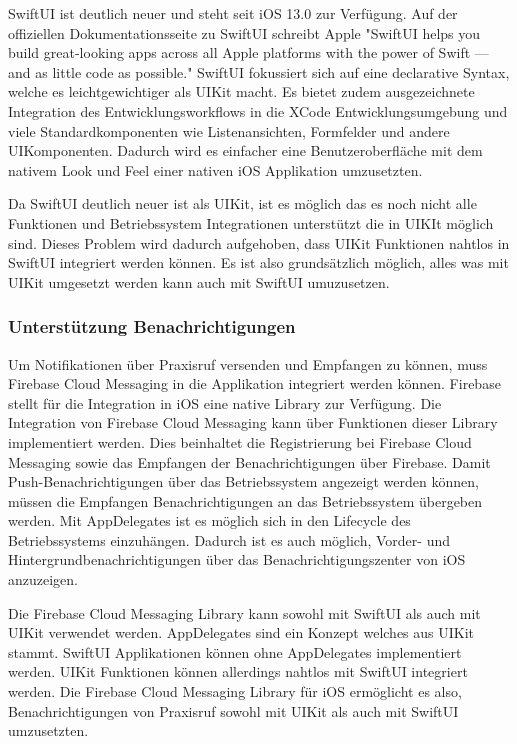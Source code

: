SwiftUI ist deutlich neuer und steht seit iOS 13.0 zur Verfügung.
Auf der offiziellen Dokumentationsseite zu SwiftUI schreibt Apple "SwiftUI helps you build great-looking apps across all Apple platforms with the power of Swift — and as little code as possible."\cite{ios_swift_ui}
SwiftUI fokussiert sich auf eine declarative Syntax, welche es leichtgewichtiger als UIKit macht.
Es bietet zudem ausgezeichnete Integration des Entwicklungsworkflows in die XCode Entwicklungsumgebung und viele Standardkomponenten wie Listenansichten, Formfelder und andere UIKomponenten.
Dadurch wird es einfacher eine Benutzeroberfläche mit dem nativem Look und Feel einer nativen iOS Applikation umzusetzten.

Da SwiftUI deutlich neuer ist als UIKit, ist es möglich das es noch nicht alle Funktionen und Betriebssystem Integrationen unterstützt die in UIKIt möglich sind.
Dieses Problem wird dadurch aufgehoben, dass UIKit Funktionen nahtlos in SwiftUI integriert werden können.\cite{ios_swift_ui_uikit}
Es ist also grundsätzlich möglich, alles was mit UIKit umgesetzt werden kann auch mit SwiftUI umuzusetzen.

\clearpage

\subsubsection{Unterstützung Benachrichtigungen}

Um Notifikationen über Praxisruf versenden und Empfangen zu können, muss Firebase Cloud Messaging in die Applikation integriert werden können. 
Firebase stellt für die Integration in iOS eine native Library zur Verfügung.\cite{firebase_github_ios} 
Die Integration von Firebase Cloud Messaging kann über Funktionen dieser Library implementiert werden.
Dies beinhaltet die Registrierung bei Firebase Cloud Messaging sowie das Empfangen der Benachrichtigungen über Firebase. \cite{firebase_ios}
Damit Push-Benachrichtigungen über das Betriebssystem angezeigt werden können, müssen die Empfangen Benachrichtigungen an das Betriebssystem übergeben werden.
Mit AppDelegates ist es möglich sich in den Lifecycle des Betriebssystems einzuhängen\cite{ios_app_delegate}.
Dadurch ist es auch möglich, Vorder- und Hintergrundbenachrichtigungen über das Benachrichtigungszenter von iOS anzuzeigen\cite{firebase_ios}.

Die Firebase Cloud Messaging Library kann sowohl mit SwiftUI als auch mit UIKit verwendet werden.
AppDelegates sind ein Konzept welches aus UIKit stammt\cite{ios_app_delegate}.
SwiftUI Applikationen können ohne AppDelegates implementiert werden.
UIKit Funktionen können allerdings nahtlos mit SwiftUI integriert werden.\cite{ios_swift_ui_uikit}
Die Firebase Cloud Messaging Library für iOS ermöglicht es also, Benachrichtigungen von Praxisruf sowohl mit UIKit als auch mit SwiftUI umzusetzten.



